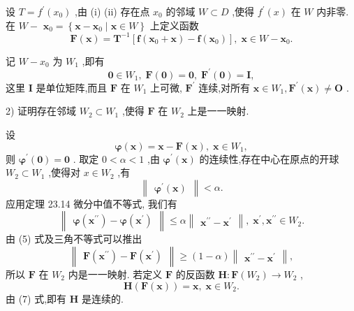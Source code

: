 设 \(T = {f}^{\prime }\left( {x}_{0}\right)\) ,由 (i) (ii) 存在点 \({x}_{0}\) 的邻域 \(W \subset  D\) ,使得 \({f}^{\prime }\left( x\right)\) 在 \(W\) 内非零. 在 \(W -\)  \({\mathbf{x}}_{0} = \left\{  {\mathbf{x} - {\mathbf{x}}_{0} \mid  \mathbf{x} \in  W}\right\}\) 上定义函数
\[
\mathbf{F}\left( \mathbf{x}\right)  = {\mathbf{T}}^{-1}\left\lbrack  {\mathbf{f}\left( {{\mathbf{x}}_{0} + \mathbf{x}}\right)  - \mathbf{f}\left( {\mathbf{x}}_{0}\right) }\right\rbrack  ,\;\mathbf{x} \in  W - {\mathbf{x}}_{0}. \tag{4}
\]


记 \(W - {x}_{0}\) 为 \({W}_{1}\) ,即有
\[
\mathbf{0} \in  {W}_{1},\;\mathbf{F}\left( \mathbf{0}\right)  = \mathbf{0},\;{\mathbf{F}}^{\prime }\left( \mathbf{0}\right)  = \mathbf{I},
\]
这里 \(\mathbf{I}\) 是单位矩阵,而且 \(\mathbf{F}\) 在 \({W}_{1}\) 上可微, \({\mathbf{F}}^{\prime }\) 连续,对所有 \(\mathbf{x} \in  {W}_{1},{\mathbf{F}}^{\prime }\left( \mathbf{x}\right)  \neq  \mathbf{O}\) .

2) 证明存在邻域 \({W}_{2} \subset  {W}_{1}\) ,使得 \(\mathbf{F}\) 在 \({W}_{2}\) 上是一一映射.

设
\[
\mathbf{\varphi }\left( \mathbf{x}\right)  = \mathbf{x} - \mathbf{F}\left( \mathbf{x}\right) ,\;\mathbf{x} \in  {W}_{1}, \tag{5}
\]
则 \({\mathbf{\varphi }}^{\prime }\left( \mathbf{0}\right)  = \mathbf{0}\) . 取定 \(0 < \alpha  < 1\) ,由 \({\mathbf{\varphi }}^{\prime }\left( \mathbf{x}\right)\) 的连续性,存在中心在原点的开球 \({W}_{2} \subset  {W}_{1}\) ,使得对 \(x \in  {W}_{2}\) ,有
\[
\begin{Vmatrix}{{\mathbf{\varphi }}^{\prime }\left( \mathbf{x}\right) }\end{Vmatrix} < \alpha . \tag{6}
\]
应用定理 23.14 微分中值不等式, 我们有
\[
\begin{Vmatrix}{\mathbf{\varphi }\left( {\mathbf{x}}^{\prime \prime }\right)  - \mathbf{\varphi }\left( {\mathbf{x}}^{\prime }\right) }\end{Vmatrix} \leq  \alpha \begin{Vmatrix}{{\mathbf{x}}^{\prime \prime } - {\mathbf{x}}^{\prime }}\end{Vmatrix},\;{\mathbf{x}}^{\prime },{\mathbf{x}}^{\prime \prime } \in  {W}_{2}.
\]
由 (5) 式及三角不等式可以推出
\[
\begin{Vmatrix}{\mathbf{F}\left( {\mathbf{x}}^{\prime \prime }\right)  - \mathbf{F}\left( {\mathbf{x}}^{\prime }\right) }\end{Vmatrix} \geq  \left( {1 - \alpha }\right) \begin{Vmatrix}{{\mathbf{x}}^{\prime \prime } - {\mathbf{x}}^{\prime }}\end{Vmatrix}, \tag{7}
\]
所以 \(\mathbf{F}\) 在 \({W}_{2}\) 内是一一映射. 若定义 \(\mathbf{F}\) 的反函数 \(\mathbf{H} : \mathbf{F}\left( {W}_{2}\right)  \rightarrow  {W}_{2}\) ,
\[
\mathbf{H}\left( {\mathbf{F}\left( \mathbf{x}\right) }\right)  = \mathbf{x},\;\mathbf{x} \in  {W}_{2}.
\]
由 (7) 式,即有 \(\mathbf{H}\) 是连续的.

